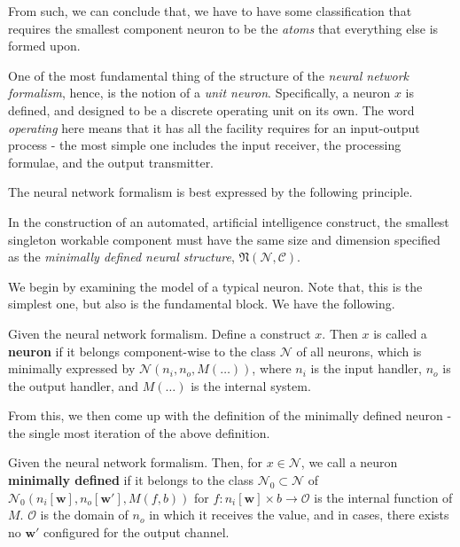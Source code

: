 \begin{note}
From such, we can conclude that, we have to have some classification that requires the smallest component neuron to be the \textit{atoms} that everything else is formed upon.
\end{note}

One of the most fundamental thing of the structure of the \textit{neural network formalism}, hence, is the notion of a \textit{unit neuron}. Specifically, a neuron $x$ is defined, and designed to be a discrete operating unit on its own. The word \textit{operating} here means that it has all the facility requires for an input-output process - the most simple one includes the input receiver, the processing formulae, and the output transmitter. 

The neural network formalism is best expressed by the following principle. 

\begin{theorem}
    In the construction of an automated, artificial intelligence construct, the smallest singleton workable component must have the same size and dimension specified as the \textit{minimally defined neural structure}, $\mathfrak{N}(\mathcal{N},\mathcal{C})$. %
\end{theorem}

We begin by examining the model of a typical neuron. Note that, this is the simplest one, but also is the fundamental block. We have the following. 

\begin{definition}[Neuron]
    Given the neural network formalism. Define a construct $x$. Then $x$ is called a \textbf{neuron} if it belongs component-wise to the class $\mathcal{N}$ of all neurons, which is minimally expressed by $\mathcal{N}(n_{i},n_{o},M(\dots))$, where $n_{i}$ is the input handler, $n_{o}$ is the output handler, and $M(\dots)$ is the internal system. %
\end{definition}

From this, we then come up with the definition of the minimally defined neuron - the single most iteration of the above definition. 

\begin{definition}
    Given the neural network formalism. Then, for $x\in \mathcal{N}$, we call a neuron \textbf{minimally defined} if it belongs to the class $\mathcal{N}_{0}\subset \mathcal{N}$ of $\mathcal{N}_{0}(n_{i}[\mathbf{w}],n_{o}[\mathbf{w}'],M(f,b))$ for $f:n_{i}[\mathbf{w}]\times b \to \mathcal{O}$ is the internal function of $M$. $\mathcal{O}$ is the domain of $n_{o}$ in which it receives the value, and in cases, there exists no $\mathbf{w}'$ configured for the output channel. %
\end{definition}


